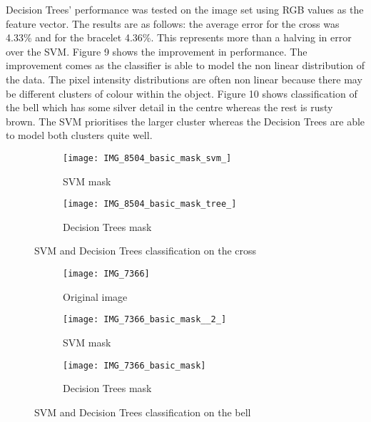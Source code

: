 \documentclass[12pt]{IIBproject}
\begin{document}
 Decision Trees' performance was tested on the image set using RGB values as the feature vector. The results are as follows: the average error for the cross was 4.33\% and for the bracelet 4.36\%. This represents more than a halving in error over the SVM. Figure 9 shows the improvement in performance. The improvement comes as the classifier is able to model the non linear distribution of the data. The pixel intensity distributions are often non linear because there may be different clusters of colour within the object. Figure 10 shows classification of the bell which has some silver detail in the centre whereas the rest is rusty brown. The SVM prioritises the larger cluster whereas the Decision Trees are able to model both clusters quite well.
\begin{figure}[H]
\centering
\begin{subfigure}{.5\textwidth}
  \centering
  \texttt{[image: IMG\_8504\_basic\_mask\_svm\_]}
  \caption{SVM mask}
  \label{fig:sub1}
\end{subfigure}%
\begin{subfigure}{.5\textwidth}
  \centering
  \texttt{[image: IMG\_8504\_basic\_mask\_tree\_]}
  \caption{Decision Trees mask}
  \label{fig:sub2}
\end{subfigure}
\caption{SVM and Decision Trees classification on the cross}
\label{fig:test}
\end{figure}
\begin{figure}[H]
\centering
\begin{subfigure}{.33\textwidth}
  \centering
  \texttt{[image: IMG\_7366]}
  \caption{Original image}
  \label{fig:sub1}
\end{subfigure}%
\begin{subfigure}{.33\textwidth}
  \centering
  \texttt{[image: IMG\_7366\_basic\_mask\_\_2\_]}
  \caption{SVM mask}
  \label{fig:sub2}
\end{subfigure}
\begin{subfigure}{.33\textwidth}
  \centering 
  \texttt{[image: IMG\_7366\_basic\_mask]}
  \caption{Decision Trees mask}
  \label{fig:sub2}
\end{subfigure}
\caption{SVM and Decision Trees classification on the bell}
\label{fig:test}
\end{figure}
\end{document}
